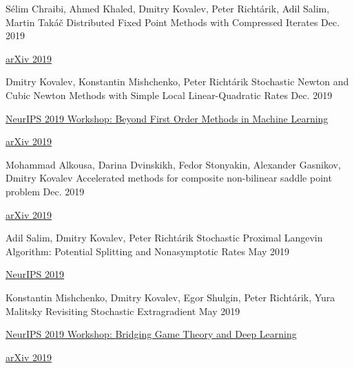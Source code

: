 
\begin{cventries}
	
\cventry
{Sélim Chraibi, Ahmed Khaled, Dmitry Kovalev, Peter Richtárik, Adil Salim, Martin Takáč} %
{Distributed Fixed Point Methods with Compressed Iterates} %
{} %
{Dec. 2019} %
{ %
	\begin{cvitems}
		\item {\href{https://arxiv.org/pdf/1912.09925.pdf}{arXiv 2019}}		
	\end{cvitems}
}	
	
\cventry
{Dmitry Kovalev, Konstantin Mishchenko, Peter Richtárik} %
{Stochastic Newton and Cubic Newton Methods with Simple Local Linear-Quadratic Rates} %
{} %
{Dec. 2019} %
{ %
	\begin{cvitems}
		\item {\href{https://sites.google.com/site/optneurips19/}{NeurIPS 2019 Workshop: Beyond First Order Methods in Machine Learning}}
		\item {\href{https://arxiv.org/pdf/1912.01597.pdf}{arXiv 2019}}		
	\end{cvitems}
}	

\cventry
{Mohammad Alkousa, Darina Dvinskikh, Fedor Stonyakin, Alexander Gasnikov, Dmitry Kovalev} %
{Accelerated methods for composite non-bilinear saddle point problem} %
{} %
{Dec. 2019} %
{ %
	\begin{cvitems}
		\item {\href{https://arxiv.org/abs/1906.03620}{arXiv 2019}}
	\end{cvitems}
}	

\cventry
{Adil Salim, Dmitry Kovalev, Peter Richtárik} %
{Stochastic Proximal Langevin Algorithm: Potential Splitting and Nonasymptotic Rates} %
{} %
{May 2019} %
{ %
	\begin{cvitems}
		\item {\href{https://papers.nips.cc/paper/8891-stochastic-proximal-langevin-algorithm-potential-splitting-and-nonasymptotic-rates}{NeurIPS 2019}}
	\end{cvitems}
}	
	
\cventry
{Konstantin Mishchenko, Dmitry Kovalev, Egor Shulgin, Peter Richtárik, Yura Malitsky} %
{Revisiting Stochastic Extragradient} %
{} %
{May 2019} %
{ %
	\begin{cvitems}
		\item {\href{https://sgo-workshop.github.io}{NeurIPS 2019 Workshop: Bridging Game Theory and Deep Learning}}
		\item {\href{https://arxiv.org/abs/1905.11373}{arXiv 2019}}
	\end{cvitems}
}


\end{cventries}

